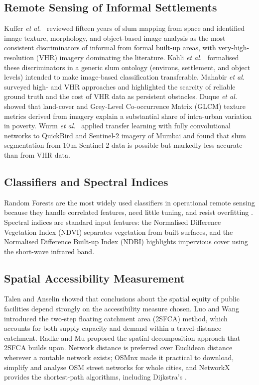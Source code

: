 \documentclass[conference]{IEEEtran}
\newcommand{\m}{\,m}
\begin{document}
\subsection{Remote Sensing of Informal Settlements}
Kuffer \textit{et al.}\ \cite{kuffer2016} reviewed fifteen years of slum mapping from space and identified image texture, morphology, and object-based image analysis as the most consistent discriminators of informal from formal built-up areas, with very-high-resolution (VHR) imagery dominating the literature. Kohli \textit{et al.}\ \cite{kohli2012} formalised these discriminators in a generic slum ontology (environs, settlement, and object levels) intended to make image-based classification transferable. Mahabir \textit{et al.}\ \cite{mahabir2018} surveyed high- and VHR approaches and highlighted the scarcity of reliable ground truth and the cost of VHR data as persistent obstacles. Duque \textit{et al.}\ \cite{duque2015} showed that land-cover and Grey-Level Co-occurrence Matrix (GLCM) texture metrics \cite{haralick1973} derived from imagery explain a substantial share of intra-urban variation in poverty. Wurm \textit{et al.}\ \cite{wurm2019} applied transfer learning with fully convolutional networks to QuickBird and Sentinel-2 imagery of Mumbai and found that slum segmentation from 10\m{} Sentinel-2 data is possible but markedly less accurate than from VHR data.

\subsection{Classifiers and Spectral Indices}
Random Forests \cite{breiman2001} are the most widely used classifiers in operational remote sensing because they handle correlated features, need little tuning, and resist overfitting \cite{belgiu2016}. Spectral indices are standard input features: the Normalised Difference Vegetation Index (NDVI) \cite{tucker1979} separates vegetation from built surfaces, and the Normalised Difference Built-up Index (NDBI) \cite{zha2003} highlights impervious cover using the short-wave infrared band.

\subsection{Spatial Accessibility Measurement}
Talen and Anselin \cite{talen1998} showed that conclusions about the spatial equity of public facilities depend strongly on the accessibility measure chosen. Luo and Wang \cite{luo2003} introduced the two-step floating catchment area (2SFCA) method, which accounts for both supply capacity and demand within a travel-distance catchment. Radke and Mu \cite{radke2000} proposed the spatial-decomposition approach that 2SFCA builds upon. Network distance is preferred over Euclidean distance wherever a routable network exists; OSMnx \cite{boeing2017} made it practical to download, simplify and analyse OSM street networks for whole cities, and NetworkX \cite{hagberg2008} provides the shortest-path algorithms, including Dijkstra's \cite{dijkstra1959}.
\end{document}
